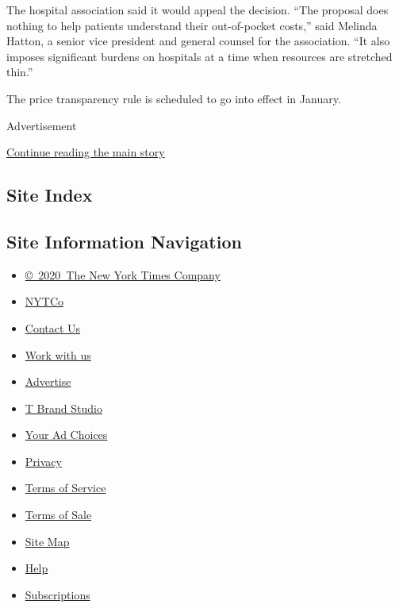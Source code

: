 The hospital association said it would appeal the decision. ``The
proposal does nothing to help patients understand their out-of-pocket
costs,'' said Melinda Hatton, a senior vice president and general
counsel for the association. ``It also imposes significant burdens on
hospitals at a time when resources are stretched thin.''

The price transparency rule is scheduled to go into effect in January.

Advertisement

\protect\hyperlink{after-bottom}{Continue reading the main story}

\hypertarget{site-index}{%
\subsection{Site Index}\label{site-index}}

\hypertarget{site-information-navigation}{%
\subsection{Site Information
Navigation}\label{site-information-navigation}}

\begin{itemize}
\tightlist
\item
  \href{https://help.nytimes3xbfgragh.onion/hc/en-us/articles/115014792127-Copyright-notice}{©~2020~The
  New York Times Company}
\end{itemize}

\begin{itemize}
\tightlist
\item
  \href{https://www.nytco.com/}{NYTCo}
\item
  \href{https://help.nytimes3xbfgragh.onion/hc/en-us/articles/115015385887-Contact-Us}{Contact
  Us}
\item
  \href{https://www.nytco.com/careers/}{Work with us}
\item
  \href{https://nytmediakit.com/}{Advertise}
\item
  \href{http://www.tbrandstudio.com/}{T Brand Studio}
\item
  \href{https://www.nytimes3xbfgragh.onion/privacy/cookie-policy\#how-do-i-manage-trackers}{Your
  Ad Choices}
\item
  \href{https://www.nytimes3xbfgragh.onion/privacy}{Privacy}
\item
  \href{https://help.nytimes3xbfgragh.onion/hc/en-us/articles/115014893428-Terms-of-service}{Terms
  of Service}
\item
  \href{https://help.nytimes3xbfgragh.onion/hc/en-us/articles/115014893968-Terms-of-sale}{Terms
  of Sale}
\item
  \href{https://spiderbites.nytimes3xbfgragh.onion}{Site Map}
\item
  \href{https://help.nytimes3xbfgragh.onion/hc/en-us}{Help}
\item
  \href{https://www.nytimes3xbfgragh.onion/subscription?campaignId=37WXW}{Subscriptions}
\end{itemize}

